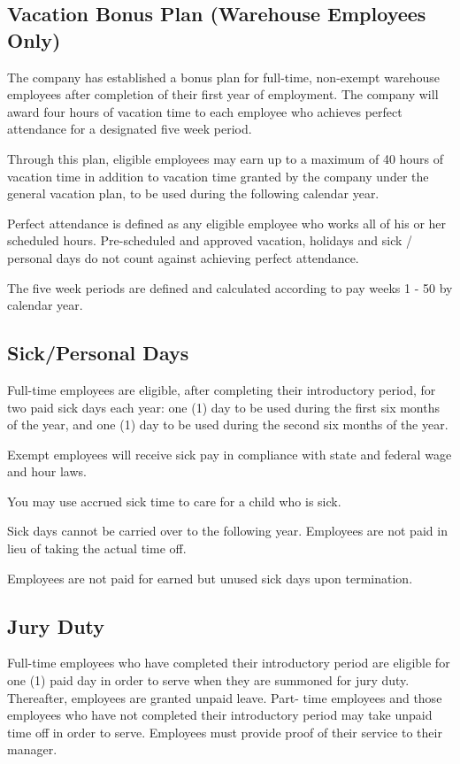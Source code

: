 \documentclass{book}
\begin{document}
\subsection{Vacation Bonus Plan (Warehouse Employees Only)}

The company has established a bonus plan for full-time, non-exempt warehouse employees after completion of their first year of employment. The company will award four hours of vacation time to each employee who achieves perfect attendance for a designated five week period.

Through this plan, eligible employees may earn up to a maximum of 40 hours of vacation time in addition to vacation time granted by the company under the general vacation plan, to be used during the following calendar year.

Perfect attendance is defined as any eligible employee who works all of his or her scheduled hours. Pre-scheduled and approved vacation, holidays and sick / personal days do not count against achieving perfect attendance.

The five week periods are defined and calculated according to pay weeks 1 - 50 by calendar year.

\subsection{Sick/Personal Days}

Full-time employees are eligible, after completing their introductory period, for two paid sick days each year: one (1) day to be used during the first six months of the year, and one (1) day to be used during the second six months of the year.

Exempt employees will receive sick pay in compliance with state and federal wage and hour laws.

You may use accrued sick time to care for a child who is sick.

Sick days cannot be carried over to the following year. Employees are not paid in lieu of taking the actual time off.

Employees are not paid for earned but unused sick days upon termination.

\subsection{Jury Duty}

Full-time employees who have completed their introductory period are eligible for one (1) paid day in order to serve when they are summoned for jury duty. Thereafter, employees are granted unpaid leave. Part- time employees and those employees who have not completed their introductory period may take unpaid time off in order to serve. Employees must provide proof of their service to their manager.
\end{document}
